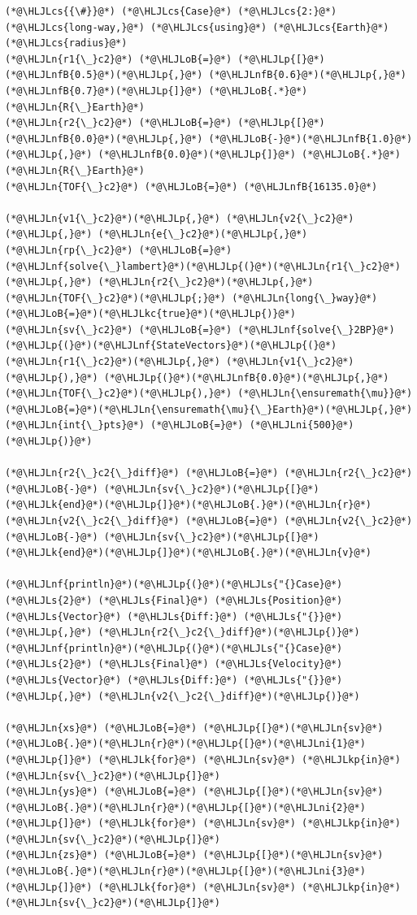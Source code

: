 \documentclass[12pt,a4paper]{article}
\newcommand{\HLJLk}[1]{\textcolor[RGB]{148,91,176}{\textbf{#1}}}
\newcommand{\HLJLkc}[1]{\textcolor[RGB]{59,151,46}{\textit{#1}}}
\newcommand{\HLJLkp}[1]{\textcolor[RGB]{148,91,176}{\textbf{#1}}}
\newcommand{\HLJLn}[1]{#1}
\newcommand{\HLJLnf}[1]{\textcolor[RGB]{66,102,213}{#1}}
\newcommand{\HLJLs}[1]{\textcolor[RGB]{201,61,57}{#1}}
\newcommand{\HLJLnfB}[1]{\textcolor[RGB]{59,151,46}{#1}}
\newcommand{\HLJLni}[1]{\textcolor[RGB]{59,151,46}{#1}}
\newcommand{\HLJLoB}[1]{\textcolor[RGB]{102,102,102}{\textbf{#1}}}
\newcommand{\HLJLp}[1]{#1}
\newcommand{\HLJLcs}[1]{\textcolor[RGB]{153,153,119}{\textit{#1}}}
\begin{document}
\begin{lstlisting}
(*@\HLJLcs{{\#}}@*) (*@\HLJLcs{Case}@*) (*@\HLJLcs{2:}@*) (*@\HLJLcs{long‐way,}@*) (*@\HLJLcs{using}@*) (*@\HLJLcs{Earth}@*) (*@\HLJLcs{radius}@*)
(*@\HLJLn{r1{\_}c2}@*) (*@\HLJLoB{=}@*) (*@\HLJLp{[}@*)(*@\HLJLnfB{0.5}@*)(*@\HLJLp{,}@*) (*@\HLJLnfB{0.6}@*)(*@\HLJLp{,}@*) (*@\HLJLnfB{0.7}@*)(*@\HLJLp{]}@*) (*@\HLJLoB{.*}@*) (*@\HLJLn{R{\_}Earth}@*)
(*@\HLJLn{r2{\_}c2}@*) (*@\HLJLoB{=}@*) (*@\HLJLp{[}@*)(*@\HLJLnfB{0.0}@*)(*@\HLJLp{,}@*) (*@\HLJLoB{-}@*)(*@\HLJLnfB{1.0}@*)(*@\HLJLp{,}@*) (*@\HLJLnfB{0.0}@*)(*@\HLJLp{]}@*) (*@\HLJLoB{.*}@*) (*@\HLJLn{R{\_}Earth}@*)
(*@\HLJLn{TOF{\_}c2}@*) (*@\HLJLoB{=}@*) (*@\HLJLnfB{16135.0}@*)

(*@\HLJLn{v1{\_}c2}@*)(*@\HLJLp{,}@*) (*@\HLJLn{v2{\_}c2}@*)(*@\HLJLp{,}@*) (*@\HLJLn{e{\_}c2}@*)(*@\HLJLp{,}@*) (*@\HLJLn{rp{\_}c2}@*) (*@\HLJLoB{=}@*) (*@\HLJLnf{solve{\_}lambert}@*)(*@\HLJLp{(}@*)(*@\HLJLn{r1{\_}c2}@*)(*@\HLJLp{,}@*) (*@\HLJLn{r2{\_}c2}@*)(*@\HLJLp{,}@*) (*@\HLJLn{TOF{\_}c2}@*)(*@\HLJLp{;}@*) (*@\HLJLn{long{\_}way}@*)(*@\HLJLoB{=}@*)(*@\HLJLkc{true}@*)(*@\HLJLp{)}@*)
(*@\HLJLn{sv{\_}c2}@*) (*@\HLJLoB{=}@*) (*@\HLJLnf{solve{\_}2BP}@*)(*@\HLJLp{(}@*)(*@\HLJLnf{StateVectors}@*)(*@\HLJLp{(}@*)(*@\HLJLn{r1{\_}c2}@*)(*@\HLJLp{,}@*) (*@\HLJLn{v1{\_}c2}@*)(*@\HLJLp{),}@*) (*@\HLJLp{(}@*)(*@\HLJLnfB{0.0}@*)(*@\HLJLp{,}@*) (*@\HLJLn{TOF{\_}c2}@*)(*@\HLJLp{),}@*) (*@\HLJLn{\ensuremath{\mu}}@*)(*@\HLJLoB{=}@*)(*@\HLJLn{\ensuremath{\mu}{\_}Earth}@*)(*@\HLJLp{,}@*) (*@\HLJLn{int{\_}pts}@*) (*@\HLJLoB{=}@*) (*@\HLJLni{500}@*)(*@\HLJLp{)}@*)

(*@\HLJLn{r2{\_}c2{\_}diff}@*) (*@\HLJLoB{=}@*) (*@\HLJLn{r2{\_}c2}@*) (*@\HLJLoB{-}@*) (*@\HLJLn{sv{\_}c2}@*)(*@\HLJLp{[}@*)(*@\HLJLk{end}@*)(*@\HLJLp{]}@*)(*@\HLJLoB{.}@*)(*@\HLJLn{r}@*)
(*@\HLJLn{v2{\_}c2{\_}diff}@*) (*@\HLJLoB{=}@*) (*@\HLJLn{v2{\_}c2}@*) (*@\HLJLoB{-}@*) (*@\HLJLn{sv{\_}c2}@*)(*@\HLJLp{[}@*)(*@\HLJLk{end}@*)(*@\HLJLp{]}@*)(*@\HLJLoB{.}@*)(*@\HLJLn{v}@*)

(*@\HLJLnf{println}@*)(*@\HLJLp{(}@*)(*@\HLJLs{"{}Case}@*) (*@\HLJLs{2}@*) (*@\HLJLs{Final}@*) (*@\HLJLs{Position}@*) (*@\HLJLs{Vector}@*) (*@\HLJLs{Diff:}@*) (*@\HLJLs{"{}}@*)(*@\HLJLp{,}@*) (*@\HLJLn{r2{\_}c2{\_}diff}@*)(*@\HLJLp{)}@*)
(*@\HLJLnf{println}@*)(*@\HLJLp{(}@*)(*@\HLJLs{"{}Case}@*) (*@\HLJLs{2}@*) (*@\HLJLs{Final}@*) (*@\HLJLs{Velocity}@*) (*@\HLJLs{Vector}@*) (*@\HLJLs{Diff:}@*) (*@\HLJLs{"{}}@*)(*@\HLJLp{,}@*) (*@\HLJLn{v2{\_}c2{\_}diff}@*)(*@\HLJLp{)}@*)

(*@\HLJLn{xs}@*) (*@\HLJLoB{=}@*) (*@\HLJLp{[}@*)(*@\HLJLn{sv}@*)(*@\HLJLoB{.}@*)(*@\HLJLn{r}@*)(*@\HLJLp{[}@*)(*@\HLJLni{1}@*)(*@\HLJLp{]}@*) (*@\HLJLk{for}@*) (*@\HLJLn{sv}@*) (*@\HLJLkp{in}@*) (*@\HLJLn{sv{\_}c2}@*)(*@\HLJLp{]}@*)
(*@\HLJLn{ys}@*) (*@\HLJLoB{=}@*) (*@\HLJLp{[}@*)(*@\HLJLn{sv}@*)(*@\HLJLoB{.}@*)(*@\HLJLn{r}@*)(*@\HLJLp{[}@*)(*@\HLJLni{2}@*)(*@\HLJLp{]}@*) (*@\HLJLk{for}@*) (*@\HLJLn{sv}@*) (*@\HLJLkp{in}@*) (*@\HLJLn{sv{\_}c2}@*)(*@\HLJLp{]}@*)
(*@\HLJLn{zs}@*) (*@\HLJLoB{=}@*) (*@\HLJLp{[}@*)(*@\HLJLn{sv}@*)(*@\HLJLoB{.}@*)(*@\HLJLn{r}@*)(*@\HLJLp{[}@*)(*@\HLJLni{3}@*)(*@\HLJLp{]}@*) (*@\HLJLk{for}@*) (*@\HLJLn{sv}@*) (*@\HLJLkp{in}@*) (*@\HLJLn{sv{\_}c2}@*)(*@\HLJLp{]}@*)


\end{lstlisting}
\end{document}
